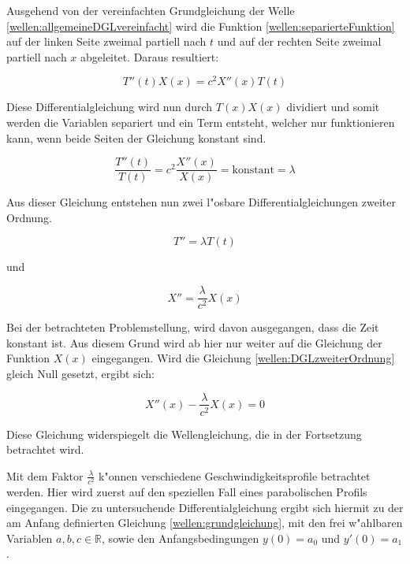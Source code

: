 \begin{refsection}
Ausgehend von der vereinfachten Grundgleichung der Welle 
\ref{wellen:allgemeineDGLvereinfacht} wird die Funktion 
\ref{wellen:separierteFunktion} auf der linken Seite zweimal partiell nach $t$ 
und auf der rechten Seite zweimal partiell nach $x$ abgeleitet. Daraus 
resultiert:

\begin{equation}
	T''(t) X(x) = c^2 X''(x)T(t)
\end{equation}

Diese Differentialgleichung wird nun durch $T(x)X(x)$ dividiert und somit 
werden die Variablen separiert und ein Term entsteht, welcher nur funktionieren 
kann, wenn beide Seiten der Gleichung konstant sind. 

\begin{equation*}
	\frac{T''(t)}{T(t)}
	=
	c^2 \frac{X''(x)}{X(x)} = \text{konstant} = \lambda
\end{equation*}

Aus dieser Gleichung entstehen nun zwei l"osbare Differentialgleichungen 
zweiter Ordnung.

\begin{equation*}
	T''= \lambda T(t)
\end{equation*}

und

\begin{equation}
	X'' = \frac{\lambda}{c^2}X(x)
	\label{wellen:DGLzweiterOrdnung}
\end{equation}

Bei der betrachteten Problemstellung, wird davon ausgegangen, dass die 
Zeit konstant ist. Aus diesem Grund wird ab hier nur weiter auf die Gleichung 
der Funktion $X(x)$ eingegangen. Wird die Gleichung 
\ref{wellen:DGLzweiterOrdnung} gleich Null gesetzt, ergibt sich:

\begin{equation*}
	X''(x) - \frac{\lambda}{c^2} X(x) = 0
\end{equation*}

Diese Gleichung widerspiegelt die Wellengleichung, die in der Fortsetzung 
betrachtet wird.

Mit dem Faktor $\frac{\lambda}{c^2}$ k"onnen verschiedene 
Geschwindigkeitsprofile betrachtet werden. Hier wird zuerst auf den speziellen 
Fall eines parabolischen Profils eingegangen. Die zu untersuchende 
Differentialgleichung ergibt sich hiermit zu der am Anfang definierten 
Gleichung \ref{wellen:grundgleichung}, mit den frei w"ahlbaren Variablen 
${a,b,c} \in \mathbb{R}$, sowie den Anfangsbedingungen $y(0) = a_0$ und $y'(0) 
= a_1$.


\end{refsection}
